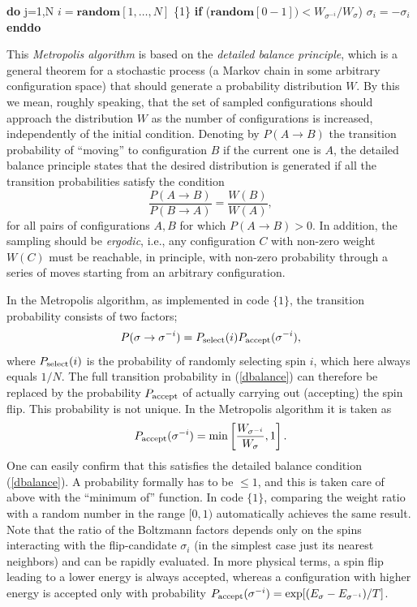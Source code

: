 \documentclass[draft,numberedheadings]{aipproc}
\newcommand{\code}{\null\vskip-2mm\noindent}
\newcommand{\br}{\hfill\break}
\newcommand{\cia}{\null\hskip5mm}
\newcommand{\cib}{\null\hskip10mm}
\begin{document}
{\code
\cia {\bf do} j=1,N \br
\cib    $i=\mathbf{random}[1,\ldots,N]$ \hfill \{1\}\break
\cib    {\bf if} ($\mathbf{random}[0-1]) < W_{\sigma^{-i}}/W_\sigma$) $\sigma_i=-\sigma_i$ \br
\cia {\bf enddo}
\code}

\noindent
This {\it Metropolis algorithm} is based on the {\it detailed balance principle}, which is a general theorem for a stochastic process (a Markov chain in some 
arbitrary configuration space) that should generate a probability distribution $W$. By this we mean, roughly speaking, 
that the set of sampled configurations should approach the distribution $W$ as the number of configurations is increased, independently of the initial
condition. Denoting by $P(A\to B)$ the transition probability of ``moving'' to configuration $B$ if the current one is $A$, the detailed balance principle 
states that the desired distribution is generated if all the transition probabilities satisfy the condition
\begin{equation}
\frac{P(A \to B)}{P(B \to A)} = \frac{W(B)}{W(A)},
\label{dbalance}
\end{equation}
for all pairs of configurations $A,B$ for which $P(A \to B) >0$. In addition, the sampling should be {\it ergodic}, i.e., any configuration $C$ with non-zero 
weight $W(C)$ must be reachable, in principle, with non-zero probability through a series of moves starting from an arbitrary configuration.

In the Metropolis algorithm, as implemented in code $\{1\}$, the transition probability consists of two factors;
\begin{equation}
P(\sigma \to \sigma^{-i})=P_{\rm select}(i) P_{\rm accept}(\sigma^{-i}), 
\label{pselpacc}
\end{equation}
where $P_{\rm select}(i)$ is the probability of randomly selecting spin $i$, which here always equals $1/N$. The full transition probability in (\ref{dbalance})
can therefore be replaced by the probability $P_{\rm accept}$ of actually carrying out (accepting) the spin flip. This probability is not unique.
In the Metropolis algorithm it is taken as
\begin{equation}
P_{\rm accept}(\sigma^{-i})={\rm min}\left [\frac{W_{\sigma^{-i}}}{W_\sigma},1\right ].
\end{equation}
One can easily confirm that this satisfies the detailed balance condition (\ref{dbalance}). A probability formally has to be $\le 1$, and 
this is taken care of above with the ``minimum of'' function. In code $\{1\}$, comparing the weight ratio with a random number in the range 
$[0,1)$ automatically achieves the same result. Note that the ratio of the Boltzmann factors depends only on the spins interacting with the flip-candidate
$\sigma_i$ (in the simplest case just its nearest neighbors) and can be rapidly evaluated. In more physical terms, a spin flip leading to a 
lower energy is always accepted, whereas a configuration with higher energy is accepted only with probability 
$P_{\rm accept}(\sigma^{-i})={\rm exp}[(E_{\sigma}-E_{\sigma^{-i}})/T]$.
\end{document}
